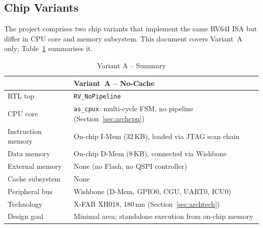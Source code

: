 
\subsection{Chip Variants}
\label{subsec:chipVariants}

The \aschip project comprises two chip variants that implement the same
RV64I ISA but differ in CPU core and memory subsystem. This document covers
Variant~A only; Table~\ref{tab:asChipVariants} summarises it.

\begin{table}[H]
\caption{Variant A -- Summary}
\label{tab:asChipVariants}
\centering
\begin{tabularx}{\textwidth}{|l |X|}
  \hline
   & \textbf{Variant~A -- No-Cache} \\
  \hline
  \hline
  RTL top & \texttt{RV\_NoPipeline} \\
  \hline
  CPU core & \texttt{as\_cpux}: multi-cycle FSM, no pipeline (Section~\ref{sec:archcpu}) \\
  \hline
  Instruction memory & On-chip I-Mem (32\,KB), loaded via JTAG scan chain \\
  \hline
  Data memory & On-chip D-Mem (8\,KB), connected via Wishbone \\
  \hline
  External memory & None (no Flash, no QSPI controller) \\
  \hline
  Cache subsystem & None \\
  \hline
  Peripheral bus & Wishbone (D-Mem, GPIO0, CGU, UART0, ICU0) \\
  \hline
  Technology & X-FAB XH018, 180\,nm (Section~\ref{sec:archtech}) \\
  \hline
  Design goal & Minimal area; standalone execution from on-chip memory \\
  \hline
\end{tabularx}
\end{table}

